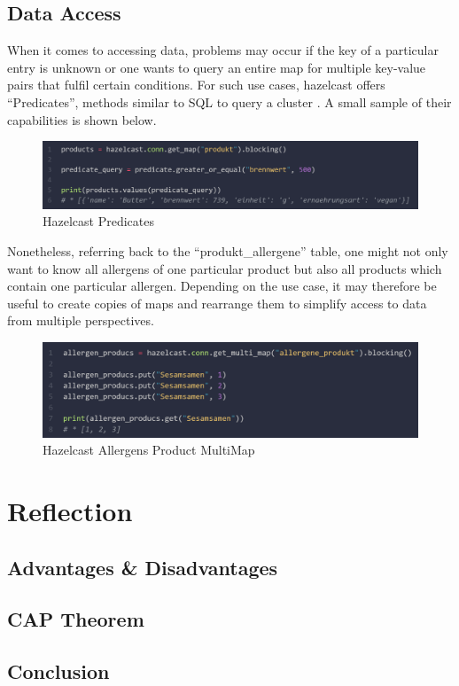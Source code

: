 \subsection{Data Access} \label{subsec:dataAccessHazelcast}

When it comes to accessing data, problems may occur if the key of a particular entry is unknown or one wants 
to query an entire map for multiple key-value pairs that fulfil certain conditions. For such use cases, 
hazelcast offers \enquote{Predicates}, methods similar to SQL to query a cluster \parencite{Hazelcast.Predicates}. 
A small sample of their capabilities is shown below. 

\begin{figure}[H]
    \includegraphics[width=1\textwidth]{images/hazelcast.predicates.png}
    \caption{Hazelcast Predicates} \label{fig:hazelcast.predicates}
\end{figure}

Nonetheless, referring back to the \enquote{produkt\_allergene} table, one might not only want to know all 
allergens of one particular product but also all products which contain one particular allergen. 
Depending on the use case, it may therefore be useful to create copies of maps and rearrange them 
to simplify access to data from multiple perspectives. 

\begin{figure}[H]
    \includegraphics[width=1\textwidth]{images/hazelcast.product_allergens.multimap.2.png}
    \caption{Hazelcast Allergens Product MultiMap} \label{fig:hazelcast.product_allergens.2.multimap}
\end{figure}




\section{Reflection} \label{sec:reflectionHazelcast}
\subsection{Advantages \& Disadvantages} \label{subsec:advantagesDisadvantagesHazelcast}
\subsection{CAP Theorem} \label{subsec:capTheoremHazelcast}
\subsection{Conclusion} \label{subsec:conclusionHazelcast}

